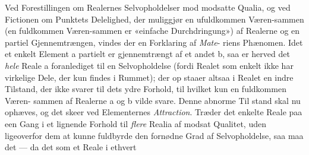\documentclass[12pt,a4paper]{book}
\begin{document}
Ved Forestillingen om Realernes Selvopholdelser mod
modsatte Qualia, og ved Fictionen om Punktets Delelighed,
der muliggjør en ufuldkommen Væren-sammen (en fuldkommen
Væren-sammen er «einfache Durchdringung») af Realerne og
en partiel Gjennemtrængen, vindes der en Forklaring af \emph{Mate}-%
riens Phænomen. Idet et enkelt Element a partielt er
gjennemtrængt af et andet b, saa er herved det \emph{hele} Reale
a foranlediget til en Selvopholdelse (fordi Realet som enkelt
ikke har virkelige Dele, der kun findes i Rummet); der op\-%
staaer altsaa i Realet en indre Tilstand, der ikke svarer til
dets ydre Forhold, til hvilket kun en fuldkommen Væren-%
sammen af Realerne a og b vilde svare. Denne abnorme Til\-%
stand skal nu ophæves, og det skeer ved Elementernes
\emph{Attraction}. Træder det enkelte Reale paa een Gang i et
lignende Forhold til \emph{flere} Realia af modsat Qualitet, uden
ligeoverfor dem at kunne fuldbyrde den fornødne Grad af
Selvopholdelse, saa maa det --- da det som et Reale i ethvert
\end{document}
